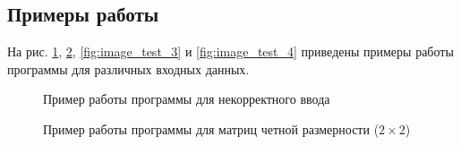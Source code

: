 \documentclass[a4paper,12pt]{article}
\begin{document}
    
    \subsection{Примеры работы}
        
        На рис. \ref{fig:image_test_1}, \ref{fig:image_test_2}, \ref{fig:image_test_3} и \ref{fig:image_test_4} приведены примеры работы программы для различных входных данных. 
        
        	\begin{figure}[h!]
                \caption{Пример работы программы для некорректного ввода}
                \label{fig:image_test_1}
            \end{figure}
            
            
            \begin{figure}[h!]
                \caption{Пример работы программы для матриц четной размерности ($2 \times 2$)}
                \label{fig:image_test_2}
            \end{figure}        
        
\end{document}
